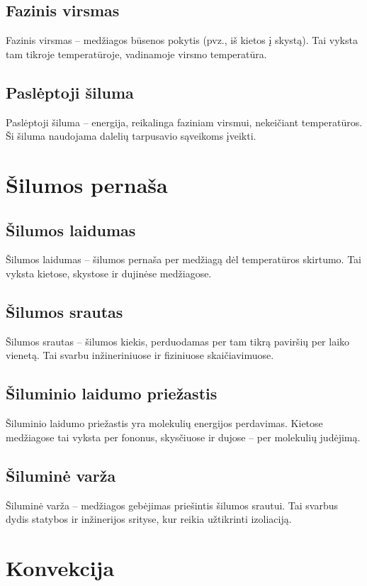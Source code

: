 \documentclass[a4paper,12pt]{article}
\begin{document}
\subsection{Fazinis virsmas}
Fazinis virsmas – medžiagos būsenos pokytis (pvz., iš kietos į skystą). Tai vyksta tam tikroje temperatūroje, vadinamoje virsmo temperatūra.

\subsection{Paslėptoji šiluma}
Paslėptoji šiluma – energija, reikalinga faziniam virsmui, nekeičiant temperatūros. Ši šiluma naudojama dalelių tarpusavio sąveikoms įveikti.

\section{Šilumos pernaša}

\subsection{Šilumos laidumas}
Šilumos laidumas – šilumos pernaša per medžiagą dėl temperatūros skirtumo. Tai vyksta kietose, skystose ir dujinėse medžiagose.

\subsection{Šilumos srautas}
Šilumos srautas – šilumos kiekis, perduodamas per tam tikrą paviršių per laiko vienetą. Tai svarbu inžineriniuose ir fiziniuose skaičiavimuose.

\subsection{Šiluminio laidumo priežastis}
Šiluminio laidumo priežastis yra molekulių energijos perdavimas. Kietose medžiagose tai vyksta per fononus, skysčiuose ir dujose – per molekulių judėjimą.

\subsection{Šiluminė varža}
Šiluminė varža – medžiagos gebėjimas priešintis šilumos srautui. Tai svarbus dydis statybos ir inžinerijos srityse, kur reikia užtikrinti izoliaciją.

\section{Konvekcija}
\end{document}
